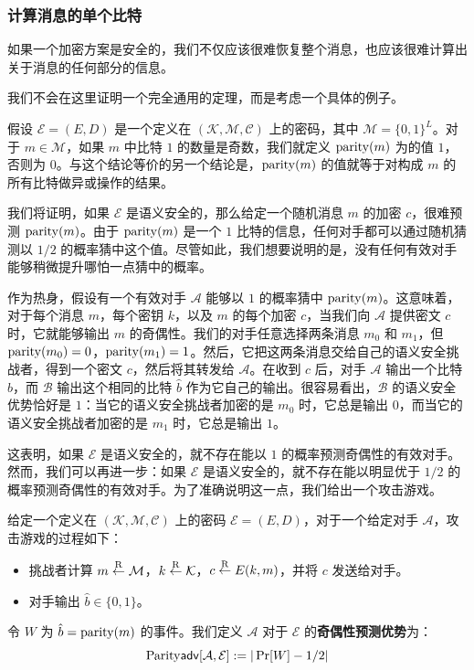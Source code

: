 \subsubsection{计算消息的单个比特}

如果一个加密方案是安全的，我们不仅应该很难恢复整个消息，也应该很难计算出关于消息的任何部分的信息。

我们不会在这里证明一个完全通用的定理，而是考虑一个具体的例子。

假设 $\mathcal{E}=(E,D)$ 是一个定义在 $(\mathcal{K},\mathcal{M},\mathcal{C})$ 上的密码，其中 $\mathcal{M}=\{0,1\}^L$。对于 $m\in\mathcal{M}$，如果 $m$ 中比特 $1$ 的数量是奇数，我们就定义 ${\rm parity}(m)$ 为的值 $1$，否则为 $0$。与这个结论等价的另一个结论是，${\rm parity}(m)$ 的值就等于对构成 $m$ 的所有比特做异或操作的结果。

我们将证明，如果 $\mathcal{E}$ 是语义安全的，那么给定一个随机消息 $m$ 的加密 $c$，很难预测 ${\rm parity}(m)$。由于 ${\rm parity}(m)$ 是一个 $1$ 比特的信息，任何对手都可以通过随机猜测以 ${1}/{2}$ 的概率猜中这个值。尽管如此，我们想要说明的是，没有任何有效对手能够稍微提升哪怕一点猜中的概率。

作为热身，假设有一个有效对手 $\mathcal{A}$ 能够以 $1$ 的概率猜中 ${\rm parity}(m)$。这意味着，对于每个消息 $m$，每个密钥 $k$，以及 $m$ 的每个加密 $c$，当我们向 $\mathcal{A}$ 提供密文 $c$ 时，它就能够输出 $m$ 的奇偶性。我们的对手任意选择两条消息 $m_0$ 和 $m_1$，但 ${\rm parity}(m_0)=0$，${\rm parity}(m_1)=1$。然后，它把这两条消息交给自己的语义安全挑战者，得到一个密文 $c$，然后将其转发给 $\mathcal{A}$。在收到 $c$ 后，对手 $\mathcal{A}$ 输出一个比特 $\hat b$，而 $\mathcal{B}$ 输出这个相同的比特 $\hat b$ 作为它自己的输出。很容易看出，$\mathcal{B}$ 的语义安全优势恰好是 $1$：当它的语义安全挑战者加密的是 $m_0$ 时，它总是输出 $0$，而当它的语义安全挑战者加密的是 $m_1$ 时，它总是输出 $1$。

这表明，如果 $\mathcal{E}$ 是语义安全的，就不存在能以 $1$ 的概率预测奇偶性的有效对手。然而，我们可以再进一步：如果 $\mathcal{E}$ 是语义安全的，就不存在能以明显优于 ${1}/{2}$ 的概率预测奇偶性的有效对手。为了准确说明这一点，我们给出一个攻击游戏。

\begin{game}[奇偶性预测]\label{game:2-3}
给定一个定义在 $(\mathcal{K},\mathcal{M},\mathcal{C})$ 上的密码 $\mathcal{E}=(E,D)$，对于一个给定对手 $\mathcal{A}$，攻击游戏的过程如下：
\begin{itemize}
	\item 挑战者计算 $m\overset{\rm R}\leftarrow\mathcal{M}$，$k\overset{\rm R}\leftarrow\mathcal{K}$，$c\overset{\rm R}\leftarrow E(k,m)$，并将 $c$ 发送给对手。
	\item 对手输出 $\hat b\in\{0,1\}$。
\end{itemize}

令 $W$ 为 $\hat b={\rm parity}(m)$ 的事件。我们定义 $\mathcal{A}$ 对于 $\mathcal{E}$ 的\textbf{奇偶性预测优势}为：
$$
{\rm Parity\mathsf{adv}}[\mathcal{A},\mathcal{E}]:=|\Pr[W]-{1}/{2}|
$$
\end{game}


